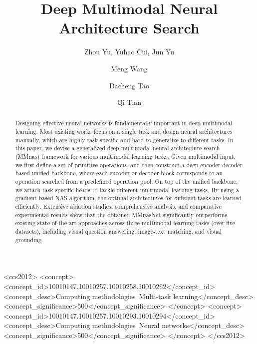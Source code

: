 \documentclass[sigconf]{acmart}
\begin{document}
\fancyhead{}
\title{Deep Multimodal Neural Architecture Search}



\author{Zhou Yu, Yuhao Cui, Jun Yu}





\author{Meng Wang}

\author{Dacheng Tao}

\author{Qi Tian}



\begin{abstract}
Designing effective neural networks is fundamentally important in deep multimodal learning. Most existing works focus on a single task and design neural architectures manually, which are highly task-specific and hard to generalize to different tasks. In this paper, we devise a generalized deep multimodal neural architecture search (MMnas) framework for various multimodal learning tasks. Given multimodal input, we first define a set of primitive operations, and then construct a deep encoder-decoder based unified backbone, where each encoder or decoder block corresponds to an operation searched from a predefined operation pool. On top of the unified backbone, we attach task-specific heads to tackle different multimodal learning tasks. By using a gradient-based NAS algorithm, the optimal architectures for different tasks are learned efficiently. Extensive ablation studies, comprehensive analysis, and comparative experimental results show that the obtained MMnasNet significantly outperforms existing state-of-the-art approaches across three multimodal learning tasks (over five datasets), including visual question answering, image-text matching, and visual grounding.
\end{abstract}

\begin{CCSXML}
<ccs2012>
<concept>
<concept_id>10010147.10010257.10010258.10010262</concept_id>
<concept_desc>Computing methodologies~Multi-task learning</concept_desc>
<concept_significance>500</concept_significance>
</concept>
<concept>
<concept_id>10010147.10010257.10010293.10010294</concept_id>
<concept_desc>Computing methodologies~Neural networks</concept_desc>
<concept_significance>500</concept_significance>
</concept>
</ccs2012>
\end{CCSXML}
\end{document}
